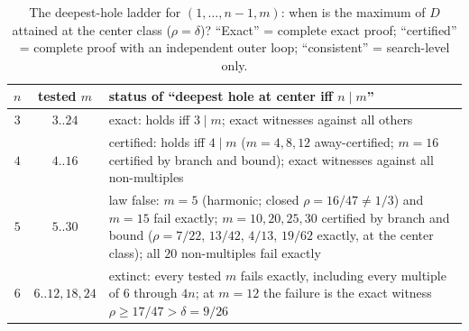 \documentclass[11pt,a4paper]{article}
\numberwithin{equation}{section}
\theoremstyle{plain}
\theoremstyle{definition}
\theoremstyle{remark}
\begin{document}
\begin{table}[htbp]
\centering
\small
\caption{The deepest-hole ladder for $(1,\dots,n{-}1,m)$: when is the
maximum of $D$ attained at the center class ($\rho=\delta$)?
``Exact'' = complete exact proof; ``certified'' = complete proof with an
independent outer loop; ``consistent'' = search-level only.}
\label{tab:ladder}
\begin{tabularx}{\textwidth}{@{} c c >{\raggedright\arraybackslash}X @{}}
\toprule
$n$ & tested $m$ & status of ``deepest hole at center iff $n\mid m$''
\\
\midrule
$3$ & $3..24$ & exact: holds iff $3\mid m$; exact witnesses against all
others \\
$4$ & $4..16$ & certified: holds iff $4\mid m$ ($m=4,8,12$
away-certified; $m=16$ certified by branch and bound); exact witnesses
against all non-multiples \\
$5$ & $5..30$ & law false: $m=5$ (harmonic; closed
$\rho=16/47\ne1/3$) and $m=15$ fail exactly; $m=10,20,25,30$ certified
by branch and bound ($\rho=7/22$, $13/42$, $4/13$, $19/62$ exactly, at
the center class); all $20$ non-multiples fail exactly
\\
$6$ & $6..12,18,24$ & extinct: every tested $m$ fails exactly,
including every multiple of $6$ through $4n$; at $m=12$ the failure is
the exact witness $\rho\ge17/47>\delta=9/26$ \\
\bottomrule
\end{tabularx}
\end{table}
\end{document}
